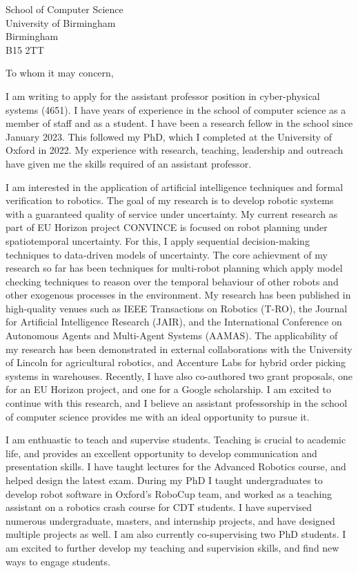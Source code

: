 \documentclass[12pt]{letter}
\begin{document}
\begin{letter}{School of Computer Science \\ University of Birmingham \\ Birmingham \\ B15 2TT}
\opening{To whom it may concern,}


I am writing to apply for the assistant professor position in cyber-physical systems (4651).
%
I have years of experience in the school of computer science as a member of staff and as a student.
%
I have been a research fellow in the school since January 2023.
%
This followed my PhD, which I completed at the University of Oxford in 2022.
%
My experience with research, teaching, leadership and outreach have given me the skills required of an assistant professor.



I am interested in the application of artificial intelligence techniques and formal verification to robotics.
%
The goal of my research is to develop robotic systems with a guaranteed quality of service under uncertainty.
%
My current research as part of EU Horizon project CONVINCE is focused on robot planning under spatiotemporal uncertainty.
%
For this, I apply sequential decision-making techniques to data-driven models of uncertainty.
%
The core achievment of my research so far has been techniques for multi-robot planning which apply model checking techniques to reason over the temporal behaviour of other robots and other exogenous processes in the environment.
%
My research has been published in high-quality venues such as IEEE Transactions on Robotics (T-RO), the Journal for Artificial Intelligence Research (JAIR), and the International Conference on Autonomous Agents and Multi-Agent Systems (AAMAS).
%
The applicability of my research has been demonstrated in external collaborations with the University of Lincoln for agricultural robotics, and Accenture Labs for hybrid order picking systems in warehouses.
%
Recently, I have also co-authored two grant proposals, one for an EU Horizon project, and one for a Google scholarship.
%
I am excited to continue with this research, and I believe an assistant professorship in the school of computer science provides me with an ideal opportunity to pursue it.

I am enthuastic to teach and supervise students.
%
Teaching is crucial to academic life, and provides an excellent opportunity to develop communication and presentation skills.
%
I have taught lectures for the Advanced Robotics course, and helped design the latest exam.
%
During my PhD I taught undergraduates to develop robot software in Oxford's RoboCup team, and worked as a teaching assistant on a robotics crash course for CDT students.
%
I have supervised numerous undergraduate, masters, and internship projects, and have designed multiple projects as well.
%
I am also currently co-supervising two PhD students.
%
I am excited to further develop my teaching and supervision skills, and find new ways to engage students.


\end{letter}
\end{document}
